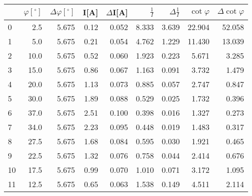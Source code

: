 \begin{tabular}{lrrrrrrrr}
\toprule
{} &  $\varphi[^\circ]$ &  $\Delta \varphi[^\circ]$ &  I[A] &  $\Delta$I[A] &  $\frac{1}{I}$ &  $\Delta \frac{1}{I}$ &  $\cot{\varphi}$ &  $\Delta \cot{\varphi}$ \\
\midrule
0  &                2.5 &                     5.675 &  0.12 &         0.052 &          8.333 &                 3.639 &           22.904 &                  52.058 \\
1  &                5.0 &                     5.675 &  0.21 &         0.054 &          4.762 &                 1.229 &           11.430 &                  13.039 \\
2  &               10.0 &                     5.675 &  0.52 &         0.060 &          1.923 &                 0.223 &            5.671 &                   3.285 \\
3  &               15.0 &                     5.675 &  0.86 &         0.067 &          1.163 &                 0.091 &            3.732 &                   1.479 \\
4  &               20.0 &                     5.675 &  1.13 &         0.073 &          0.885 &                 0.057 &            2.747 &                   0.847 \\
5  &               30.0 &                     5.675 &  1.89 &         0.088 &          0.529 &                 0.025 &            1.732 &                   0.396 \\
6  &               37.0 &                     5.675 &  2.51 &         0.100 &          0.398 &                 0.016 &            1.327 &                   0.273 \\
7  &               34.0 &                     5.675 &  2.23 &         0.095 &          0.448 &                 0.019 &            1.483 &                   0.317 \\
8  &               27.5 &                     5.675 &  1.68 &         0.084 &          0.595 &                 0.030 &            1.921 &                   0.465 \\
9  &               22.5 &                     5.675 &  1.32 &         0.076 &          0.758 &                 0.044 &            2.414 &                   0.676 \\
10 &               17.5 &                     5.675 &  0.99 &         0.070 &          1.010 &                 0.071 &            3.172 &                   1.095 \\
11 &               12.5 &                     5.675 &  0.65 &         0.063 &          1.538 &                 0.149 &            4.511 &                   2.114 \\
\bottomrule
\end{tabular}
